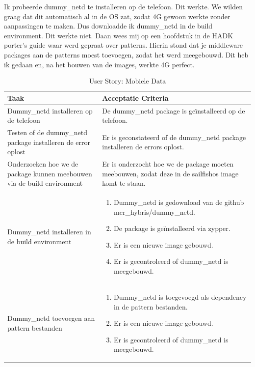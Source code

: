 \documentclass[a4paper]{report}
\newcommand{\userstorycolor}{PeachPuff1}
\begin{document}
\begin{tcolorbox}[colback=white, coltitle=black, colframe=\userstorycolor, title=\textbf{User Story: }Als gebruiker wil ik graag met de Fairphone mobiele data kunnen gebruiken\, zodat ik ook onderweg internet kan gebruiken.]
  \par\smallskip 
    Ik probeerde dummy\_netd te installeren op de telefoon. Dit werkte. We wilden graag dat dit automatisch al in de OS zat, zodat 4G gewoon werkte zonder aanpassingen te maken.
    Dus downloadde ik dummy\_netd in de build environment. Dit werkte niet. 
    Daan wees mij op een hoofdstuk in de HADK porter's guide waar werd gepraat over patterns.
    Hierin stond dat je middleware packages aan de patterns moest toevoegen, zodat het werd meegebouwd.
    Dit heb ik gedaan en, na het bouwen van de images, werkte 4G perfect.

  \begin{table}[H]
      \centering
    \begin{tabularx}{1\textwidth}{|X|X|}
      \hline
      \cellcolor[HTML]{ffcc99} \textbf{Taak} & \cellcolor[HTML]{ffcc99} \textbf{Acceptatie Criteria} \\ 
      \hline
      Dummy\_netd installeren op de telefoon & De dummy\_netd package is geïnstalleerd op de telefoon. \\
      \hline 
      Testen of de dummy\_netd package installeren de error oplost & Er is geconstateerd of de dummy\_netd package installeren de errors oplost. \\
      \hline 
      Onderzoeken hoe we de package kunnen meebouwen via de build environment & Er is onderzocht hoe we de package moeten meebouwen, zodat deze in de sailfishos image komt te staan. \\ 
      \hline 
      Dummy\_netd installeren in de build environment & 
      \begin{enumerate}
        \item Dummy\_netd is gedownload van de github mer\_hybris/dummy\_netd.
        \item De package is geïnstalleerd via zypper.
        \item Er is een nieuwe image gebouwd.
        \item Er is gecontroleerd of dummy\_netd is meegebouwd.
      \end{enumerate} \\
      \hline
      Dummy\_netd toevoegen aan pattern bestanden & 
      \begin{enumerate}
        \item Dummy\_netd is toegevoegd als dependency in de pattern bestanden.
        \item Er is een nieuwe image gebouwd.
        \item Er is gecontroleerd of dummy\_netd is meegebouwd.
      \end{enumerate} \\
      \hline
    \end{tabularx}
    \caption{User Story: Mobiele Data}
  \label{table:it4:story_mobiledata}
  \end{table}
  \end{tcolorbox}
\end{document}
